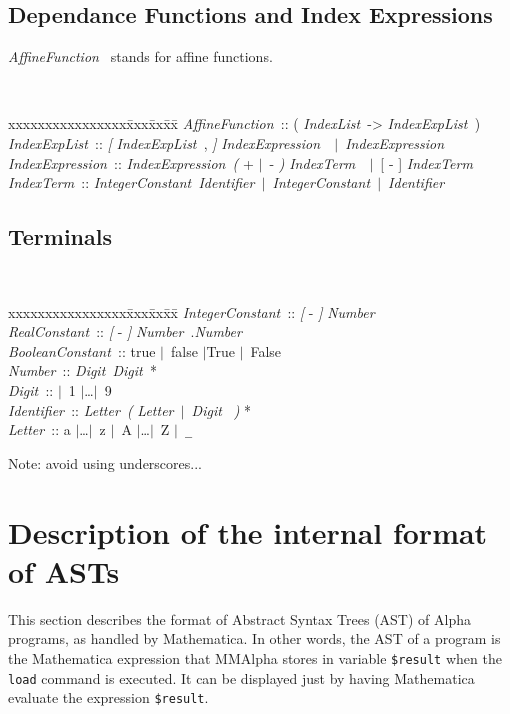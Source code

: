 \documentclass[12pt]{article}
\newcommand{\Alpha}{{\sc Alpha}}
\newcommand{\MMA}{{\sc MMAlpha}}
\newcommand{\alfa}{\Alpha}
\newcommand{\MMAlfa}{\MMA}
\newcommand{\mma}{{Mathematica}}
\newcommand{\Opt}[1]{{\rm\sl [} #1 {\rm\sl ]}}
\newcommand{\Group}[1]{{\rm\sl (} #1 {\rm\sl )}}
\newcommand{\Alt}{$\mid$}
\newcommand{\Identifier}{{\sl Identifier\ }}
\newcommand{\IndexList}{{\sl IndexList\ }}
\newcommand{\AffineFunction}{{\sl AffineFunction\ }}
\newcommand{\IndexExpList}{{\sl IndexExpList\ }}
\newcommand{\IntegerConstant}{{\sl IntegerConstant\ }}
\newcommand{\RealConstant}{{\sl RealConstant\ }}
\newcommand{\BooleanConstant}{{\sl BooleanConstant\ }}
\newcommand{\IndexExpression}{{\sl IndexExpression\ }}
\newcommand{\IndexTerm}{{\sl IndexTerm\ }}
\newcommand{\Number}{{\sl Number\ }}
\newcommand{\Digit}{{\sl Digit\ }}
\newcommand{\Letter}{{\sl Letter\ }}
\begin{document}
\subsection{Dependance Functions and Index Expressions}
\AffineFunction{} stands for affine functions. 
{\tt
\begin{tabbing}
xxxxxxxxxxxxxxxx\= xxx\= xx\=  xx\= \kill
\AffineFunction \>::\>\> ( \IndexList -> \IndexExpList )\\
\IndexExpList \>::\>\> \Opt{ \IndexExpList, } \IndexExpression\
          \Alt\ \IndexExpression\\
\IndexExpression \>::\>\> \IndexExpression \Group{+ \Alt\  - } \IndexTerm\
          \Alt\ [ - ] \IndexTerm\\
\IndexTerm \>::\>\> \IntegerConstant \Identifier \Alt\ \IntegerConstant \Alt\ \Identifier
\end{tabbing}
}


\subsection{Terminals}
{\tt
\begin{tabbing}
xxxxxxxxxxxxxxxx\= xxx\= xx\=  xx\= \kill
\IntegerConstant \>::\>\> \Opt{-} \Number\\
\RealConstant \>::\>\> \Opt{-} \Number .\Number\\
\BooleanConstant \>::\>\> true \Alt\ false \Alt True \Alt\ False\\
\Number \>::\>\> \Digit \Digit *\\
\Digit \>::\>\> 0 \Alt\ 1 \Alt\ldots\Alt\ 9\\
\Identifier \>::\>\> \Letter \Group{\Letter \Alt\ \Digit} *\\
\Letter \>::\>\> a \Alt\ldots\Alt\ z  \Alt\ A \Alt\ldots\Alt\ Z \Alt\ \verb'_'\\
\end{tabbing}
}
Note: avoid using underscores...

\section{Description of the internal format of ASTs}
\label{ast}
This section describes the format of Abstract Syntax Trees (AST) of
\alfa{} programs, as handled by \mma{}. In other words, 
the AST of a program is the \mma{} expression that \MMAlfa{} stores in 
variable \texttt{\$result} when the \texttt{load} command is 
executed. It can be displayed just by having \mma{} evaluate
the expression \texttt{\$result}.
\end{document}

